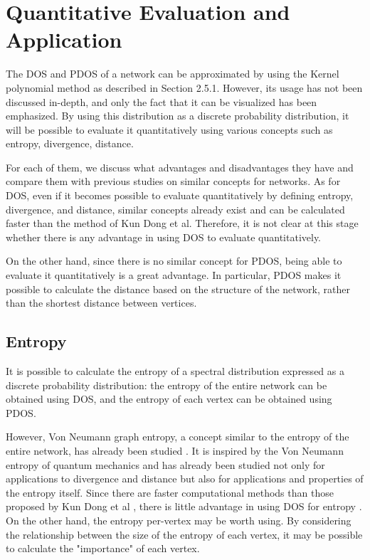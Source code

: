 \documentclass[senior,final,11pt]{iscs-thesis}
\begin{document}
\section{Quantitative Evaluation and Application}
The DOS and PDOS of a network can be approximated by using the Kernel polynomial method as described in Section 2.5.1. However, its usage has not been discussed in-depth, and only the fact that it can be visualized has been emphasized.
By using this distribution as a discrete probability distribution, it will be possible to evaluate it quantitatively using various concepts such as entropy, divergence, distance.

For each of them, we discuss what advantages and disadvantages they have and compare them with previous studies on similar concepts for networks. As for DOS, even if it becomes possible to evaluate quantitatively by defining entropy, divergence, and distance, similar concepts already exist and can be calculated faster than the method of Kun Dong et al. Therefore, it is not clear at this stage whether there is any advantage in using DOS to evaluate quantitatively.

On the other hand, since there is no similar concept for PDOS, being able to evaluate it quantitatively is a great advantage. In particular, PDOS makes it possible to calculate the distance based on the structure of the network, rather than the shortest distance between vertices.

\subsection{Entropy}
It is possible to calculate the entropy of a spectral distribution expressed as a discrete probability distribution: the entropy of the entire network can be obtained using DOS, and the entropy of each vertex can be obtained using PDOS.

However, Von Neumann graph entropy, a concept similar to the entropy of the entire network, has already been studied \cite{braunstein2006laplacian, chen2019fast,tsitsulin2020just}. It is inspired by the Von Neumann entropy of quantum mechanics and has already been studied not only for applications to divergence and distance but also for applications and properties of the entropy itself. Since there are faster computational methods \cite{chen2019fast,tsitsulin2020just} than those proposed by Kun Dong et al \cite{dong2019network}, there is little advantage in using DOS for entropy .
On the other hand, the entropy per-vertex may be worth using. By considering the relationship between the size of the entropy of each vertex, it may be possible to calculate the "importance" of each vertex.
\end{document}
